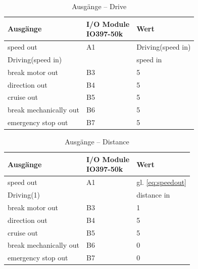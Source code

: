 \pagebreak[1]
\begin{table}[!ht]
	\centering
	\caption{Ausgänge – Drive}
	\label{Automat_man:tab:drive}
	\begin{tabular}{lll}
		\hline
		\textbf{Ausgänge}                           & \makecell{\textbf{I/O Module}                     \\ \textbf{IO397-50k}}                 & \textbf{Wert} \\ \hline
		\multicolumn{1}{l|}{speed out}              & \multicolumn{1}{l|}{A1}       & Driving(speed in) \\
		\multicolumn{1}{l|}{Driving(speed in)}      & \multicolumn{1}{l|}{}         & speed in          \\
		\multicolumn{1}{l|}{break motor out}        & \multicolumn{1}{l|}{B3}       & 5                 \\
		\multicolumn{1}{l|}{direction out}          & \multicolumn{1}{l|}{B4}       & 5                 \\
		\multicolumn{1}{l|}{cruise out}             & \multicolumn{1}{l|}{B5}       & 5                 \\
		\multicolumn{1}{l|}{break mechanically out} & \multicolumn{1}{l|}{B6}       & 5                 \\
		\multicolumn{1}{l|}{emergency stop out}     & \multicolumn{1}{l|}{B7}       & 5                 \\ \hline
	\end{tabular}
\end{table}
\pagebreak[2]


\pagebreak[1]
\begin{table}[!ht]
	\centering
	\caption{Ausgänge – Distance}
	\label{Automat_man:tab:distance}
	\begin{tabular}{lll}
		\hline
		\textbf{Ausgänge}                           & \makecell{\textbf{I/O Module}                         \\ \textbf{IO397-50k}}                 & \textbf{Wert} \\ \hline
		\multicolumn{1}{l|}{speed out}              & \multicolumn{1}{l|}{A1}       & gl. \ref{eq:speedout} \\
		\multicolumn{1}{l|}{Driving(1)}             & \multicolumn{1}{l|}{}         & distance in           \\
		\multicolumn{1}{l|}{break motor out}        & \multicolumn{1}{l|}{B3}       & 1                     \\
		\multicolumn{1}{l|}{direction out}          & \multicolumn{1}{l|}{B4}       & 5                     \\
		\multicolumn{1}{l|}{cruise out}             & \multicolumn{1}{l|}{B5}       & 5                     \\
		\multicolumn{1}{l|}{break mechanically out} & \multicolumn{1}{l|}{B6}       & 0                     \\
		\multicolumn{1}{l|}{emergency stop out}     & \multicolumn{1}{l|}{B7}       & 0                     \\ \hline
	\end{tabular}
\end{table}
\pagebreak[2]


